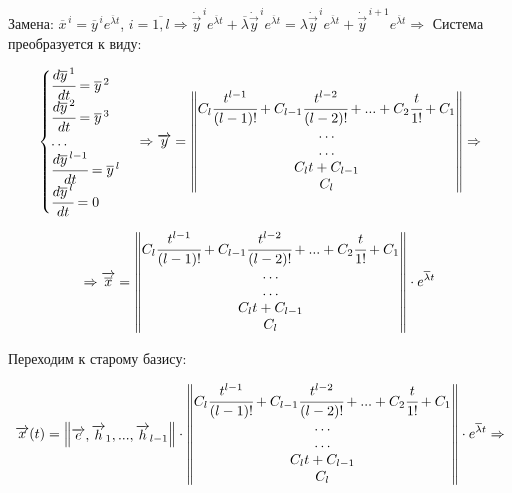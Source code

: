 Замена: $\overline{x}^{\,i} = \overline{y}^{\,i} e^{\overline{\lambda} t}$, $i = \overline{1, l} \Rightarrow \dot{\overrightarrow{y}}^{\,i} e^{\overline{\lambda} t} + \overline{\lambda} \dot{\overrightarrow{y}}^{\,i} e^{\overline{\lambda} t} = \lambda \dot{\overrightarrow{y}}^{\,i} e^{\overline{\lambda} t} + \dot{\overrightarrow{y}}^{\,i+1} e^{\overline{\lambda} t} \Rightarrow$
Система преобразуется к виду:

\begin{equation}
    \begin{cases}
        \cfrac{d\overline{y}^{\,1}}{dt} = \overline{y}^{\,2} \\ 
        \cfrac{d\overline{y}^{\,2}}{dt} = \overline{y}^{\,3} \\
        \ldots \\
        \cfrac{d\overline{y}^{\,l-1}}{dt} = \overline{y}^{\,l} \\
        \cfrac{d\overline{y}^{\,l}}{dt} = 0
    \end{cases}
    \Rightarrow 
    \overrightarrow{y} = \begin{Vmatrix*} C_l \cfrac{t^{l-1}}{(l-1)!} + C_{l-1} \cfrac{t^{l-2}}{(l-2)!} + ... + C_2 \cfrac{t}{1!} + C_1 \\
                            \ldots \\
                            \ldots \\
                            C_l t + C_{l-1} \\
                            C_l \end{Vmatrix*} \Rightarrow  
\end{equation}

\begin{equation*}
    \Rightarrow \overrightarrow{\overline{x}} = \begin{Vmatrix*} C_l \cfrac{t^{l-1}}{(l-1)!} + C_{l-1} \cfrac{t^{l-2}}{(l-2)!} + ... + C_2 \cfrac{t}{1!} + C_1 \\
    \ldots \\
    \ldots \\
    C_l t + C_{l-1} \\
    C_l \end{Vmatrix*} \cdot e^{\overline{\lambda} t} 
\end{equation*}


Переходим к старому базису: 

\[ \overrightarrow{x}(t) =
    \begin{Vmatrix*}
        \overrightarrow{e}, \overrightarrow{h}_1, ..., \overrightarrow{h}_{l-1} 
    \end{Vmatrix*} \cdot \begin{Vmatrix*} C_l \cfrac{t^{l-1}}{(l-1)!} + C_{l-1} \cfrac{t^{l-2}}{(l-2)!} + ... + C_2 \cfrac{t}{1!} + C_1 \\
    \ldots \\
    \ldots \\
    C_l t + C_{l-1} \\
    C_l \end{Vmatrix*} \cdot e^{\overline{\lambda} t} \Rightarrow
\] 

